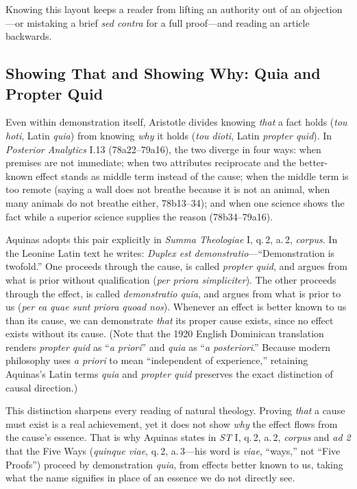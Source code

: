Knowing this layout keeps a reader from lifting an authority out of an objection---or mistaking a brief \emph{sed contra} for a full proof---and reading an article backwards.

\subsection{Showing That and Showing Why: Quia and Propter Quid}

Even within demonstration itself, Aristotle divides knowing \emph{that} a fact holds (\emph{tou hoti}, Latin \emph{quia}) from knowing \emph{why} it holds (\emph{tou dioti}, Latin \emph{propter quid}). In \emph{Posterior Analytics} I.13 (78a22--79a16), the two diverge in four ways: when premises are not immediate; when two attributes reciprocate and the better-known effect stands as middle term instead of the cause; when the middle term is too remote (saying a wall does not breathe because it is not an animal, when many animals do not breathe either, 78b13--34); and when one science shows the fact while a superior science supplies the reason (78b34--79a16).

Aquinas adopts this pair explicitly in \emph{Summa Theologiae} I, q.\,2, a.\,2, \emph{corpus}. In the Leonine Latin text he writes: \emph{Duplex est demonstratio}---``Demonstration is twofold.'' One proceeds through the cause, is called \emph{propter quid}, and argues from what is prior without qualification (\emph{per priora simpliciter}). The other proceeds through the effect, is called \emph{demonstratio quia}, and argues from what is prior to us (\emph{per ea quae sunt priora quoad nos}). Whenever an effect is better known to us than its cause, we can demonstrate \emph{that} its proper cause exists, since no effect exists without its cause. (Note that the 1920 English Dominican translation renders \emph{propter quid} as ``\emph{a priori}'' and \emph{quia} as ``\emph{a posteriori}.'' Because modern philosophy uses \emph{a priori} to mean ``independent of experience,'' retaining Aquinas's Latin terms \emph{quia} and \emph{propter quid} preserves the exact distinction of causal direction.)

This distinction sharpens every reading of natural theology. Proving \emph{that} a cause must exist is a real achievement, yet it does not show \emph{why} the effect flows from the cause's essence. That is why Aquinas states in \emph{ST} I, q.\,2, a.\,2, \emph{corpus} and \emph{ad 2} that the Five Ways (\emph{quinque viae}, q.\,2, a.\,3---his word is \emph{viae}, ``ways,'' not ``Five Proofs'') proceed by demonstration \emph{quia}, from effects better known to us, taking what the name signifies in place of an essence we do not directly see.

